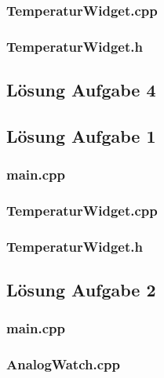 \subsubsection{TemperaturWidget.cpp}

\subsubsection{TemperaturWidget.h}


\subsection{Lösung Aufgabe 4}


\setcounter{section}{14}
\setcounter{subsection}{1}

\subsection{Lösung Aufgabe 1}
\subsubsection{main.cpp}

\subsubsection{TemperaturWidget.cpp}

\subsubsection{TemperaturWidget.h}


\subsection{Lösung Aufgabe 2}
\subsubsection{main.cpp}

\subsubsection{AnalogWatch.cpp}

